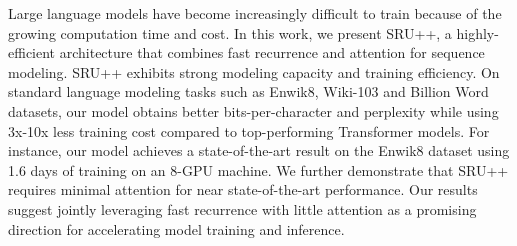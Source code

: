 Large language models have become increasingly difficult to train because of the growing computation time and cost. In this work, we present SRU++, a highly-efficient architecture that combines fast recurrence and attention for sequence modeling. SRU++ exhibits strong modeling capacity and training efficiency. On standard language modeling tasks such as Enwik8, Wiki-103 and Billion Word datasets, our model obtains better bits-per-character and perplexity while using 3x-10x less training cost compared to top-performing Transformer models. For instance, our model achieves a state-of-the-art result on the Enwik8 dataset using 1.6 days of training on an 8-GPU machine. We further demonstrate that SRU++ requires minimal attention for near state-of-the-art performance. Our results suggest jointly leveraging fast recurrence with little attention as a promising direction for accelerating model training and inference.
